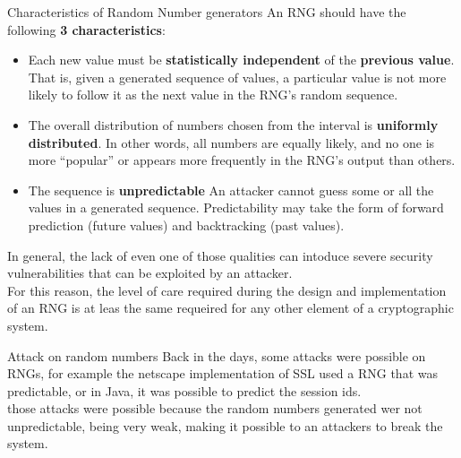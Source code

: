 \begin{subsection}{Characteristics of Random Number generators}
  An RNG should have the following \textbf{3 characteristics}:
  \begin{itemize}
    \item Each new value must be \textbf{statistically independent} of the \textbf{previous value}.
      \subitem That is, given a generated sequence of values, a particular value is not more likely 
       to follow it as the next value in the RNG's random sequence.
    \item The overall distribution of numbers chosen from the interval is \textbf{uniformly distributed}.
      \subitem In other words, all numbers are equally likely, and no one is more “popular” or 
        appears more frequently in the RNG’s output than others.
    \item The sequence is \textbf{unpredictable}
      \subitem An attacker cannot guess some or all the values in a generated sequence. Predictability 
        may take the form of forward prediction (future values) and backtracking (past values).
  \end{itemize}

  In general, the lack of even one of those qualities can intoduce severe security vulnerabilities
  that can be exploited by an attacker.\\
  For this reason, the level of care required during the design and implementation of an RNG is
  at leas the same requeired for any other element of a cryptographic system.
\end{subsection}
\begin{paragraph}{Attack on random numbers}
  Back in the days, some attacks were possible on RNGs, for example the netscape implementation of 
  SSL used a RNG that was predictable, or in Java, it was possible to predict the session ids.\\
  those attacks were possible because the random numbers generated wer not unpredictable, being very 
  weak, making it possible to an attackers to break the system.\\
\end{paragraph}
